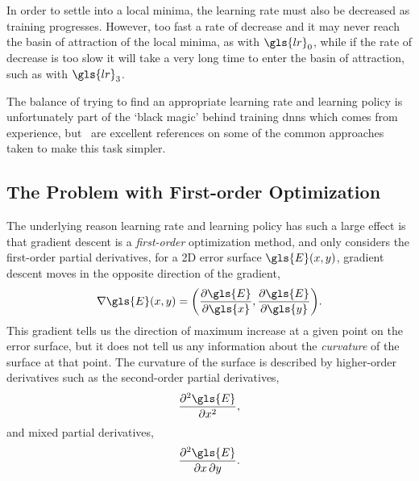 \documentclass[thesis]{subfiles}
\begin{document}
In order to settle into a local minima, the learning rate must also be decreased as training progresses. However, too fast a rate of decrease and it may never reach the basin of attraction of the local minima, as with $\gls{lr}_0$, while if the rate of decrease is too slow it will take a very long time to enter the basin of attraction, such as with $\gls{lr}_3$. 

The balance of trying to find an appropriate learning rate and learning policy is unfortunately part of the `black magic' behind training \glspl{dnn} which comes from experience, but~\citep{Bottou2012sgdtricks, goodfellow2016deep} are excellent references on some of the common approaches taken to make this task simpler.

\subsection{The Problem with First-order Optimization}\label{pathological}
The underlying reason learning rate and learning policy has such a large effect is that gradient descent is a \emph{first-order} optimization method, and only considers the first-order partial derivatives, \ie for a 2D error surface $\gls{E}(x, y)$, gradient descent moves in the opposite direction of the gradient,
\begin{equation}
    \nabla \gls{E}(x, y) = {\left(\frac{\partial \gls{E}}{\partial \gls{x}}, \frac{\partial \gls{E}}{\partial \gls{y}}\right)}.
\end{equation}
This gradient tells us the direction of maximum increase at a given point on the error surface, but it does not tell us any information about the \emph{curvature} of the surface at that point. The curvature of the surface is described by higher-order derivatives such as the second-order partial derivatives, \eg
\begin{equation}
    \frac{\partial^2 \gls{E}}{\partial x^2},
\end{equation}
and mixed partial derivatives, \eg
\begin{equation}
    \frac{\partial^2 \gls{E}}{\partial x\,\partial y}.
\end{equation}
%
\end{document}
